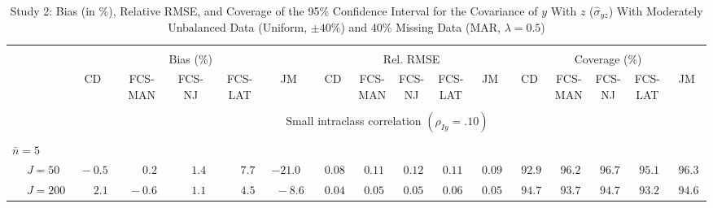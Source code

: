 \begin{sidewaystable}
\begin{threeparttable}
\setlength{\tabcolsep}{1.0pt}
\renewcommand{\arraystretch}{0.95}
\footnotesize
\caption{\small Study 2: Bias (in \%), Relative RMSE, and Coverage of the 95\% Confidence Interval for the Covariance of $y$ With $z$ ($\hat\sigma_{yz}$) With Moderately Unbalanced Data (Uniform, $\pm 40\%$) and 40\% Missing Data (MAR, $\lambda=0.5$)}
\begin{tabular}{llccccccccccccccc}
\hline\\[-1.8ex]
& & \multicolumn{5}{c}{Bias (\%)} & \multicolumn{5}{c}{Rel. RMSE} & \multicolumn{5}{c}{Coverage (\%)} \\ \cmidrule(r){3-7}\cmidrule(r){8-12}\cmidrule(r){13-17}
 &  & CD & \makecell{FCS-\\MAN} & \makecell{FCS-\\NJ} & \makecell{FCS-\\LAT} & JM & CD & \makecell{FCS-\\MAN} & \makecell{FCS-\\NJ} & \makecell{FCS-\\LAT} & JM & CD & \makecell{FCS-\\MAN} & \makecell{FCS-\\NJ} & \makecell{FCS-\\LAT} & \multicolumn{1}{c}{JM} \\ 
[0.4ex]\hline\\[-1.8ex]
& & \multicolumn{15}{c}{Small intraclass correlation $(\rho_{Iy}=.10)$} \\[0.6ex]\hline\\[-1.8ex]
\multicolumn{4}{l}{$\bar{n}=5$} \\  & \nopagebreak $\;J=50$  & $\phantom{0}{-}0.5\phantom{0}$ & $\phantom{0}\phantom{-}0.2\phantom{0}$ & $\phantom{0}\phantom{-}1.4\phantom{0}$ & $\phantom{0}\phantom{-}7.7\phantom{0}$ & ${-}21.0\phantom{0}$ & $\phantom{0}0.08\phantom{0}$ & $\phantom{0}0.11\phantom{0}$ & $\phantom{0}0.12\phantom{0}$ & $\phantom{0}0.11\phantom{0}$ & $\phantom{0}0.09\phantom{0}$ & $\phantom{0}92.9\phantom{0}$ & $\phantom{0}96.2\phantom{0}$ & $\phantom{0}96.7\phantom{0}$ & $\phantom{0}95.1\phantom{0}$ & $\phantom{0}96.3\phantom{0}$ \\
 & \nopagebreak $\;J=200$  & $\phantom{0}\phantom{-}2.1\phantom{0}$ & $\phantom{0}{-}0.6\phantom{0}$ & $\phantom{0}\phantom{-}1.1\phantom{0}$ & $\phantom{0}\phantom{-}4.5\phantom{0}$ & $\phantom{0}{-}8.6\phantom{0}$ & $\phantom{0}0.04\phantom{0}$ & $\phantom{0}0.05\phantom{0}$ & $\phantom{0}0.05\phantom{0}$ & $\phantom{0}0.06\phantom{0}$ & $\phantom{0}0.05\phantom{0}$ & $\phantom{0}94.7\phantom{0}$ & $\phantom{0}93.7\phantom{0}$ & $\phantom{0}94.7\phantom{0}$ & $\phantom{0}93.2\phantom{0}$ & $\phantom{0}94.6\phantom{0}$ \\

\end{tabular}
\end{threeparttable}
\end{sidewaystable}
